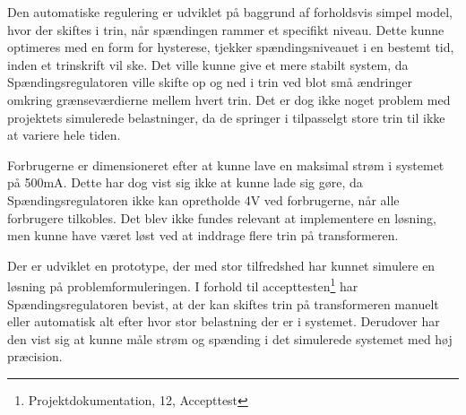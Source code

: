 
Den automatiske regulering er udviklet på baggrund af forholdsvis simpel model, hvor der skiftes i trin, når spændingen rammer et specifikt niveau. Dette kunne optimeres med en form for hysterese, tjekker spændingsniveauet i en bestemt tid, inden et trinskrift vil ske. Det ville kunne give et mere stabilt system, da Spændingsregulatoren ville skifte op og ned i trin ved blot små ændringer omkring grænseværdierne mellem hvert trin. Det er dog ikke noget problem med projektets simulerede belastninger, da de springer i tilpasselgt store trin til ikke at variere hele tiden.

Forbrugerne er dimensioneret efter at kunne lave en maksimal strøm i systemet på 500mA. Dette har dog vist sig ikke at kunne lade sig gøre, da Spændingsregulatoren ikke kan opretholde 4V ved forbrugerne, når alle forbrugere tilkobles. Det blev ikke fundes relevant at implementere en løsning, men kunne have været løst ved at inddrage flere trin på transformeren.

Der er udviklet en prototype, der med stor tilfredshed har kunnet simulere en løsning på problemformuleringen. I forhold til accepttesten\footnote{Projektdokumentation, 12, Accepttest} har Spændingsregulatoren bevist, at der kan skiftes trin på transformeren manuelt eller automatisk alt efter hvor stor belastning der er i systemet. Derudover har den vist sig at kunne måle strøm og spænding i det simulerede systemet med høj præcision.